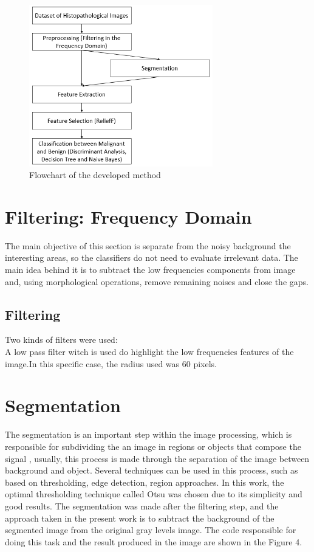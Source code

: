 \documentclass[conference]{IEEEtran}
\begin{document}
\begin{figure}[h]
    \centering
    \includegraphics[width=8cm]{images/imagem3.png}
    \caption{Flowchart of the developed method}
    \label{fig:my_label}
\end{figure}

\section{Filtering: Frequency Domain}
The main objective of this section is separate from the noisy background the interesting areas, so the classifiers do not need to evaluate irrelevant data.
The main idea behind it is to subtract the low frequencies components from image and, using morphological operations, remove remaining noises and close the gaps.
\subsection{Filtering}
Two kinds of filters were used:\\
A low pass filter witch is used do highlight the low frequencies features of the image.In this specific case, the radius used was 60 pixels.


\section{Segmentation}
The segmentation is an important step within the image processing, which is responsible for subdividing the an image in regions or objects that compose the signal \cite{Gonzalez:2006:DIP:1076432}, usually, this process is made through the separation of the image between background and object. Several techniques can be used in this process, such as based on thresholding, edge detection, region approaches. In this work, the optimal thresholding technique called Otsu was chosen due to its simplicity and good results. The segmentation was made after the filtering step, and the approach taken in the present work is to subtract the background of the segmented image from the original gray levels image. The code responsible for doing this task and the result produced in the image are shown in the Figure 4.
\end{document}
